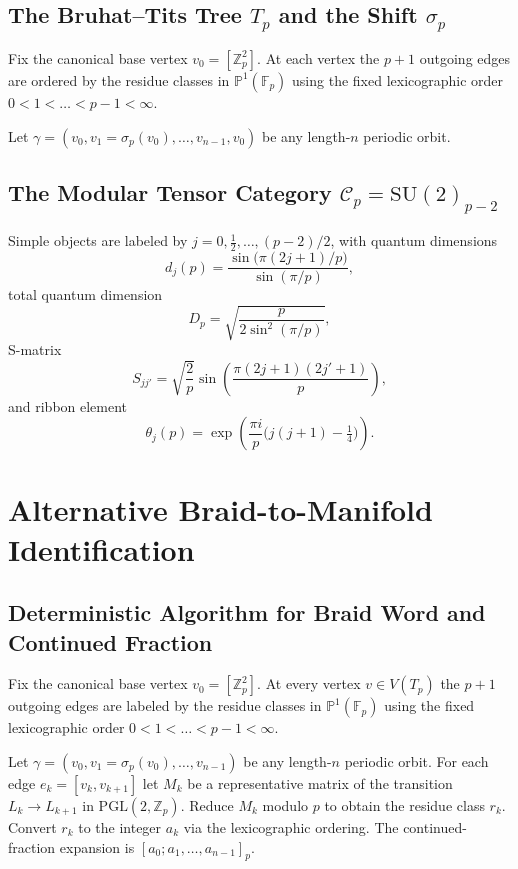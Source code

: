\documentclass[11pt,a4paper]{amsart}
\begin{document}
\subsection{The Bruhat--Tits Tree \(T_p\) and the Shift \(\sigma_p\)}
Fix the canonical base vertex \(v_0 = [\mathbb{Z}_p^2]\). At each vertex the \(p+1\) outgoing edges are ordered by the residue classes in \(\mathbb{P}^1(\mathbb{F}_p)\) using the fixed lexicographic order \(0 < 1 < \dots < p-1 < \infty\).

Let \(\gamma = (v_0, v_1 = \sigma_p(v_0), \dots, v_{n-1}, v_0)\) be any length-\(n\) periodic orbit.

\subsection{The Modular Tensor Category \(\mathcal{C}_p = \mathrm{SU}(2)_{p-2}\)}
Simple objects are labeled by \(j = 0, \frac12, \dots, (p-2)/2\), with quantum dimensions
\[
d_j(p) = \frac{\sin\bigl(\pi(2j+1)/p\bigr)}{\sin(\pi/p)},
\]
total quantum dimension
\[
D_p = \sqrt{\frac{p}{2\sin^2(\pi/p)}},
\]
S-matrix
\[
S_{jj'} = \sqrt{\frac{2}{p}} \sin\left( \frac{\pi(2j+1)(2j'+1)}{p} \right),
\]
and ribbon element
\[
\theta_j(p) = \exp\left( \frac{\pi i}{p} \bigl( j(j+1) - \tfrac14 \bigr) \right).
\]

\section{Alternative Braid-to-Manifold Identification}

\subsection{Deterministic Algorithm for Braid Word and Continued Fraction}
\label{subsec:deterministic-algorithm}

Fix the canonical base vertex \(v_0 = [\mathbb{Z}_p^2]\). At every vertex \(v \in V(T_p)\) the \(p+1\) outgoing edges are labeled by the residue classes in \(\mathbb{P}^1(\mathbb{F}_p)\) using the fixed lexicographic order \(0 < 1 < \dots < p-1 < \infty\).

Let \(\gamma = (v_0, v_1 = \sigma_p(v_0), \dots, v_{n-1})\) be any length-\(n\) periodic orbit. For each edge \(e_k = [v_k, v_{k+1}]\) let \(M_k\) be a representative matrix of the transition \(L_k \to L_{k+1}\) in \(\mathrm{PGL}(2,\mathbb{Z}_p)\). Reduce \(M_k\) modulo \(p\) to obtain the residue class \(r_k\). Convert \(r_k\) to the integer \(a_k\) via the lexicographic ordering. The continued-fraction expansion is \([a_0; a_1, \dots, a_{n-1}]_p\).
\end{document}
